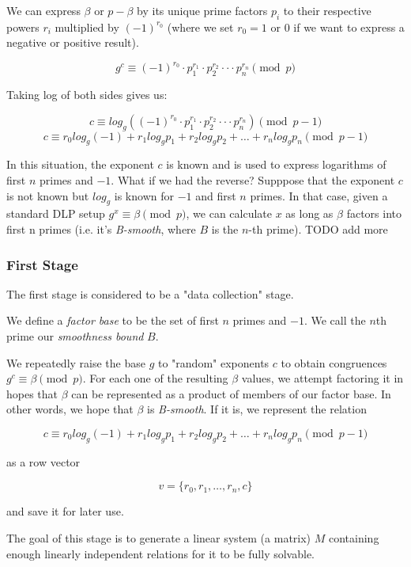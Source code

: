 \documentclass{article}
\begin{document}
        We can express $\beta$ or $p - \beta$ by its unique prime factors $p_i$ to their respective powers $r_i$ multiplied by $(-1)^{r_0}$ (where we set $r_0 = 1$ or $0$ if we want to express a negative or positive result).

        $$g^c \equiv (-1)^{r_0} \cdot p_1^{r_1} \cdot p_2^{r_2} \cdot \cdot \cdot p_n^{r_n} \pmod{p}$$

        Taking log of both sides gives us:

        $$c \equiv log_g((-1)^{r_0} \cdot p_1^{r_1} \cdot p_2^{r_2} \cdot \cdot \cdot p_n^{r_n}) \pmod{p-1}$$
        $$c \equiv r_0 log_g (-1) + r_1 log_g p_1 + r_2 log_g p_2 + \ldots + r_n log_g p_n \pmod{p-1}$$

        In this situation, the exponent $c$ is known and is used to express logarithms of first $n$ primes and $-1$. What if we had the reverse? Supppose that the exponent $c$ is not known but $log_g$ is known for $-1$ and first $n$ primes. In that case, given a standard DLP setup $g^x \equiv \beta \pmod{p}$, we can calculate $x$ as long as $\beta$ factors into first n primes (i.e. it's \emph{B-smooth}, where $B$ is the $n$-th prime). TODO add more

        \subsubsection{First Stage}

        The first stage is considered to be a "data collection" stage.

        We define a \emph{factor base} to be the set of first $n$ primes and $-1$. We call the $n$th prime our \emph{smoothness bound} $B$.

        We repeatedly raise the base $g$ to "random" exponents $c$ to obtain congruences $g^c \equiv \beta \pmod{p}$. For each one of the resulting $\beta$ values, we attempt factoring it in hopes that $\beta$ can be represented as a product of members of our factor base. In other words, we hope that $\beta$ is \emph{B-smooth}. If it is, we represent the relation

        $$c \equiv r_0 log_g (-1) + r_1 log_g p_1 + r_2 log_g p_2 + \ldots + r_n log_g p_n \pmod{p-1}$$

        as a row vector

        $$v = \{ r_0, r_1, \ldots, r_n, c\}$$

        and save it for later use.

        The goal of this stage is to generate a linear system (a matrix) $M$ containing enough linearly independent relations for it to be fully solvable.
\end{document}
